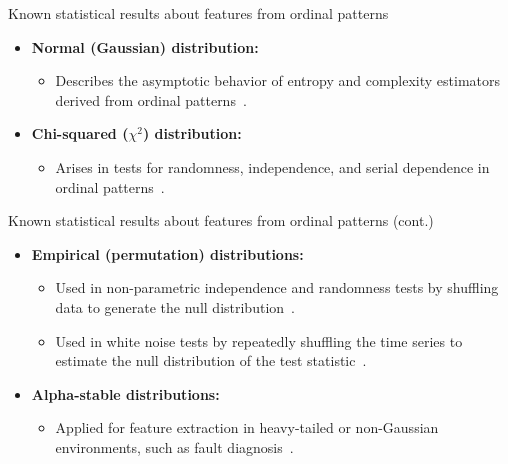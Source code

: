 \documentclass{beamer}
\begin{document}
\begin{frame}{Known statistical results about features from ordinal patterns}
	\begin{itemize}
		\item \textbf{Normal (Gaussian) distribution:}
		\begin{itemize}
			\item Describes the asymptotic behavior of entropy and complexity estimators derived from ordinal patterns~\cite{Chagas2022, Rey2023, Rey2023a, Rey2024, Rey2025}.
		\end{itemize}
		\item \textbf{Chi-squared ($\chi^2$) distribution:}
		\begin{itemize}
			\item Arises in tests for randomness, independence, and serial dependence in ordinal patterns~\cite{Rey2023, Rey2024, Rey2025, YamashitaRiosDeSousa2022, Shternshis2025}.
		\end{itemize}
	\end{itemize}
\end{frame}

\begin{frame}{Known statistical results about features from ordinal patterns (cont.)}
	\begin{itemize}
		\item \textbf{Empirical (permutation) distributions:}
		\begin{itemize}
			\item Used in non-parametric independence and randomness tests by shuffling data to generate the null distribution~\cite{MatillaGarcia2008, AshtariNezhad2019}.
			\item Used in white noise tests by repeatedly shuffling the time series to estimate the null distribution of the test statistic~\cite{Chagas2022a}.
		\end{itemize}
		\item \textbf{Alpha-stable distributions:}
		\begin{itemize}
			\item Applied for feature extraction in heavy-tailed or non-Gaussian environments, such as fault diagnosis~\cite{Chouri2014}.
		\end{itemize}
	\end{itemize}
\end{frame}
\end{document}
